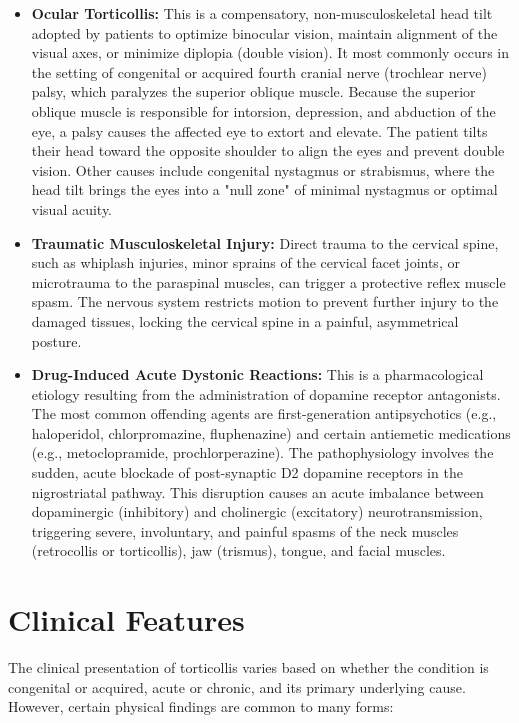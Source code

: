 \begin{itemize}
    \item \textbf{Ocular Torticollis:} This is a compensatory, non-musculoskeletal head tilt adopted by patients to optimize binocular vision, maintain alignment of the visual axes, or minimize diplopia (double vision). It most commonly occurs in the setting of congenital or acquired fourth cranial nerve (trochlear nerve) palsy, which paralyzes the superior oblique muscle. Because the superior oblique muscle is responsible for intorsion, depression, and abduction of the eye, a palsy causes the affected eye to extort and elevate. The patient tilts their head toward the opposite shoulder to align the eyes and prevent double vision. Other causes include congenital nystagmus or strabismus, where the head tilt brings the eyes into a "null zone" of minimal nystagmus or optimal visual acuity.
    \item \textbf{Traumatic Musculoskeletal Injury:} Direct trauma to the cervical spine, such as whiplash injuries, minor sprains of the cervical facet joints, or microtrauma to the paraspinal muscles, can trigger a protective reflex muscle spasm. The nervous system restricts motion to prevent further injury to the damaged tissues, locking the cervical spine in a painful, asymmetrical posture.
    \item \textbf{Drug-Induced Acute Dystonic Reactions:} This is a pharmacological etiology resulting from the administration of dopamine receptor antagonists. The most common offending agents are first-generation antipsychotics (e.g., haloperidol, chlorpromazine, fluphenazine) and certain antiemetic medications (e.g., metoclopramide, prochlorperazine). The pathophysiology involves the sudden, acute blockade of post-synaptic D2 dopamine receptors in the nigrostriatal pathway. This disruption causes an acute imbalance between dopaminergic (inhibitory) and cholinergic (excitatory) neurotransmission, triggering severe, involuntary, and painful spasms of the neck muscles (retrocollis or torticollis), jaw (trismus), tongue, and facial muscles.
\end{itemize}

\section*{Clinical Features}
The clinical presentation of torticollis varies based on whether the condition is congenital or acquired, acute or chronic, and its primary underlying cause. However, certain physical findings are common to many forms:


